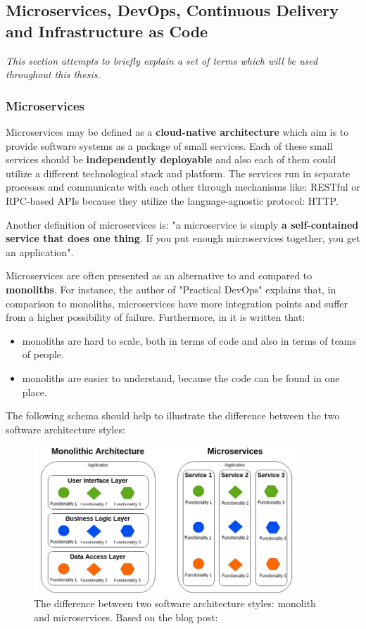 \subsection{Microservices, DevOps, Continuous Delivery and Infrastructure as Code}
\textit{This section attempts to briefly explain a set of terms which will be used throughout this thesis.}


\subsubsection{Microservices}
Microservices may be defined as a \textbf{cloud-native architecture} which aim is to provide software systems as a package of small services. Each of these small services should be \textbf{independently deployable} and also each of them could utilize a different technological stack and platform. The services run in separate processes and communicate with each other through mechanisms like: RESTful or RPC-based APIs\cite{article-micro-devops} because they utilize the language-agnostic protocol: HTTP\cite{book-pr-devops}.

Another definition of microservices is: "a microservice is simply \textbf{a self-contained service that does one thing}. If you put enough microservices together, you get an application"\cite{book-cndwk}.

Microservices are often presented as an alternative to and compared to \textbf{monoliths}. For instance, the author of "Practical DevOps"\cite{book-pr-devops} explains that, in comparison to monoliths, microservices have more integration points and suffer from a
higher possibility of failure. Furthermore, in \cite{book-cndwk} it is written that:
\begin{itemize}
\item monoliths are hard to scale, both in terms of code and also in terms of teams of people.
\item monoliths are easier to understand, because the code can be found in one place.
\end{itemize}

The following schema should help to illustrate the difference between the two software architecture styles:
\begin{figure}[H]
    \centering
    \includegraphics[width=10cm]{figures/microservices-vs-mono.png}
    \captionsetup{justification=centering,margin=2cm}
    \caption{The difference between two software architecture styles: monolith and microservices. Based on the blog post:\cite{online-trans-mono-micro}}
\end{figure}

